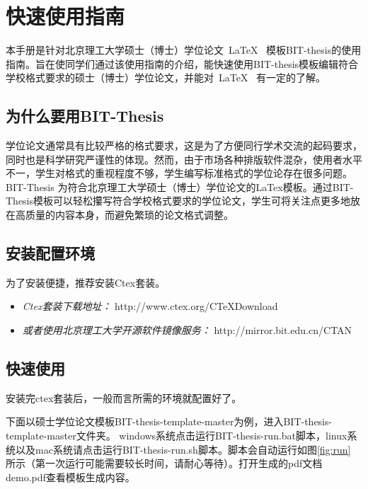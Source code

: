 
\chapter{快速使用指南}
\label{chap:what}

本手册是针对北京理工大学硕士（博士）学位论文~\LaTeX~ 模板BIT-thesis的使用指南。旨在使同学们通过该使用指南的介绍，能快速使用BIT-thesis模板编辑符合学校格式要求的硕士（博士）学位论文，并能对~\LaTeX~ 有一定的了解。

\section{为什么要用BIT-Thesis}
\label{sec:why}
学位论文通常具有比较严格的格式要求，这是为了方便同行学术交流的起码要求，同时也是科学研究严谨性的体现。然而，由于市场各种排版软件混杂，使用者水平不一，学生对格式的重视程度不够，学生编写标准格式的学位论存在很多问题。BIT-Thesis 为符合北京理工大学硕士（博士）学位论文的LaTex模板。通过BIT-Thesis模板可以轻松攥写符合学校格式要求的学位论文，学生可将关注点更多地放在高质量的内容本身，而避免繁琐的论文格式调整。

\section{安装配置环境}
\label{sec:requirements}

为了安装便捷，推荐安装Ctex套装。

\begin{itemize}
\item \textit{Ctex套装下载地址：}  http://www.ctex.org/CTeXDownload

\item \textit{或者使用北京理工大学开源软件镜像服务：}  http://mirror.bit.edu.cn/CTAN

\end{itemize}



\section{快速使用}
\label{sec:process}

安装完ctex套装后，一般而言所需的环境就配置好了。

下面以硕士学位论文模板BIT-thesis-template-master为例，进入BIT-thesis-template-master文件夹。
windows系统点击运行BIT-thesis-run.bat脚本，linux系统以及mac系统请点击运行BIT-thesis-run.sh脚本。脚本会自动运行如图\ref{fig:run} 所示（第一次运行可能需要较长时间，请耐心等待）。打开生成的pdf文档demo.pdf查看模板生成内容。
 
